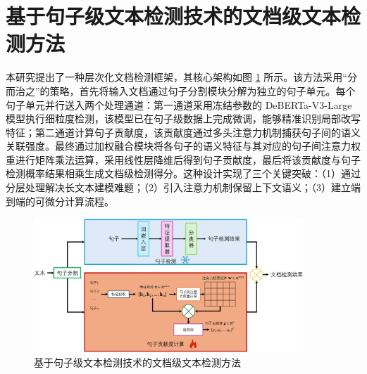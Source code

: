 


\section{基于句子级文本检测技术的文档级文本检测方法}
\label{sec:method-sent2arti}

本研究提出了一种层次化文档检测框架，其核心架构如图 \ref{fig:method-sent2arti} 所示。该方法采用“分而治之”的策略，首先将输入文档通过句子分割模块分解为独立的句子单元。每个句子单元并行送入两个处理通道：第一通道采用冻结参数的 DeBERTa-V3-Large 模型执行细粒度检测，该模型已在句子级数据上完成微调，能够精准识别局部改写特征；第二通道计算句子贡献度，该贡献度通过多头注意力机制捕获句子间的语义关联强度。最终通过加权融合模块将各句子的语义特征与其对应的句子间注意力权重进行矩阵乘法运算，采用线性层降维后得到句子贡献度，最后将该贡献度与句子检测概率结果相乘生成文档级检测得分。这种设计实现了三个关键突破：（1）通过分层处理解决长文本建模难题；（2）引入注意力机制保留上下文语义；（3）建立端到端的可微分计算流程。

\begin{figure}[htbp]
    \centering
    \includegraphics[width=0.9\textwidth]{figures/sent2arti2.jpg}
    \caption{基于句子级文本检测技术的文档级文本检测方法}
    \label{fig:method-sent2arti}
\end{figure}

